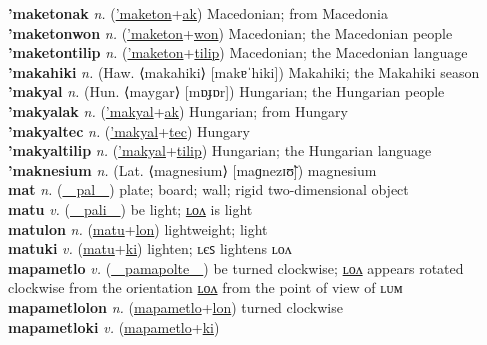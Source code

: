 \textbf{'maketonak} \textit{n.} (\hyperref['maketon]{'maketon}+\hyperref[ak]{ak})
Macedonian; from Macedonia \label{'maketonak} \\
\textbf{'maketonwon} \textit{n.} (\hyperref['maketon]{'maketon}+\hyperref[won]{won})
Macedonian; the Macedonian people \label{'maketonwon} \\
\textbf{'maketontilip} \textit{n.} (\hyperref['maketon]{'maketon}+\hyperref[tilip]{tilip})
Macedonian; the Macedonian language \label{'maketontilip} \\
\textbf{'makahiki} \textit{n.} (Haw. ⟨makahiki⟩ [makɐˈhiki])
Makahiki; the Makahiki season \label{'makahiki} \\
\textbf{'makyal} \textit{n.} (Hun. ⟨maygar⟩ [mɒɟɒr])
Hungarian; the Hungarian people \label{'makyal} \\
\textbf{'makyalak} \textit{n.} (\hyperref['makyal]{'makyal}+\hyperref[ak]{ak})
Hungarian; from Hungary \label{'makyalak} \\
\textbf{'makyaltec} \textit{n.} (\hyperref['makyal]{'makyal}+\hyperref[tec]{tec})
Hungary \label{'makyaltec} \\
\textbf{'makyaltilip} \textit{n.} (\hyperref['makyal]{'makyal}+\hyperref[tilip]{tilip})
Hungarian; the Hungarian language \label{'makyaltilip} \\
\textbf{'maknesium} \textit{n.} (Lat. ⟨magnesium⟩ [maɡnezɪʊ̃])
magnesium \label{'maknesium} \\
\textbf{mat} \textit{n.} (\hyperref[pal]{~~pal~~})
plate; board; wall; rigid two-dimensional object \label{mat} \\
\textbf{matu} \textit{v.} (\hyperref[pali]{~~pali~~})
be light; \hyperref[matulon]{ʟᴏᴧ} is light \label{matu} \\
\textbf{matulon} \textit{n.} (\hyperref[matu]{matu}+\hyperref[lon]{lon})
lightweight; light \label{matulon} \\
\textbf{matuki} \textit{v.} (\hyperref[matu]{matu}+\hyperref[ki]{ki})
lighten; ʟєꜱ lightens ʟᴏᴧ \label{matuki} \\
\textbf{mapametlo} \textit{v.} (\hyperref[pamapolte]{~~pamapolte~~})
be turned clockwise; \hyperref[mapametlolon]{ʟᴏᴧ} appears rotated clockwise from the orientation \hyperref[mapametlolon]{ʟᴏᴧ} from the point of view of ʟᴜᴍ \label{mapametlo} \\
\textbf{mapametlolon} \textit{n.} (\hyperref[mapametlo]{mapametlo}+\hyperref[lon]{lon})
turned clockwise \label{mapametlolon} \\
\textbf{mapametloki} \textit{v.} (\hyperref[mapametlo]{mapametlo}+\hyperref[ki]{ki})
